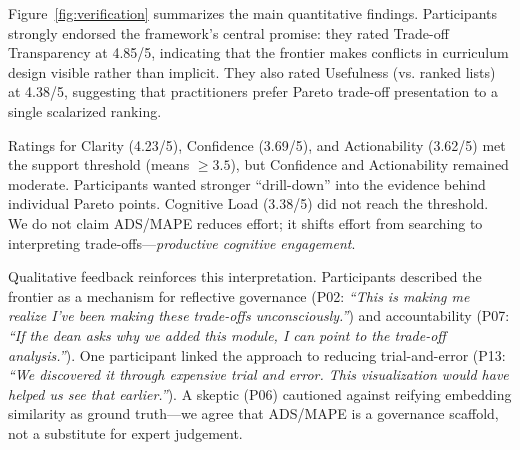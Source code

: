 \documentclass[sigconf,review]{acmart}
\newcommand{\ADS}{\textsc{ADS}\xspace}
\newcommand{\MAPE}{\textsc{MAPE}\xspace}
\begin{document}
\begin{table}[t]
\centering
\caption{Pilot Study Results: Expert Ratings (n=13). Ratings on 5-point Likert scale (1=Strongly Disagree, 5=Strongly Agree). CD=Course Developers, ID=Instructional Designers. Verified: $\geq$4.0, Supported: $\geq$3.5, Partial: $<$3.5.}
\label{tab:pilot_results}
\end{table}

Figure~\ref{fig:verification} summarizes the main quantitative findings. Participants strongly endorsed the framework's central promise: they rated {Trade-off Transparency} at {4.85/5}, indicating that the frontier makes conflicts in curriculum design visible rather than implicit. They also rated {Usefulness (vs. ranked lists)} at {4.38/5}, suggesting that practitioners prefer Pareto trade-off presentation to a single scalarized ranking.

Ratings for Clarity (4.23/5), Confidence (3.69/5), and Actionability (3.62/5) met the support threshold (means $\ge 3.5$), but Confidence and Actionability remained moderate. Participants wanted stronger ``drill-down'' into the evidence behind individual Pareto points. Cognitive Load (3.38/5) did not reach the threshold. We do not claim \ADS/\MAPE reduces effort; it shifts effort from searching to interpreting trade-offs---\emph{productive cognitive engagement}.

Qualitative feedback reinforces this interpretation. Participants described the frontier as a mechanism for reflective governance (P02: \textit{``This is making me realize I've been making these trade-offs unconsciously.''}) and accountability (P07: \textit{``If the dean asks why we added this module, I can point to the trade-off analysis.''}). One participant linked the approach to reducing trial-and-error (P13: \textit{``We discovered it through expensive trial and error. This visualization would have helped us see that earlier.''}). A skeptic (P06) cautioned against reifying embedding similarity as ground truth---we agree that \ADS/\MAPE is a governance scaffold, not a substitute for expert judgement.
\end{document}
